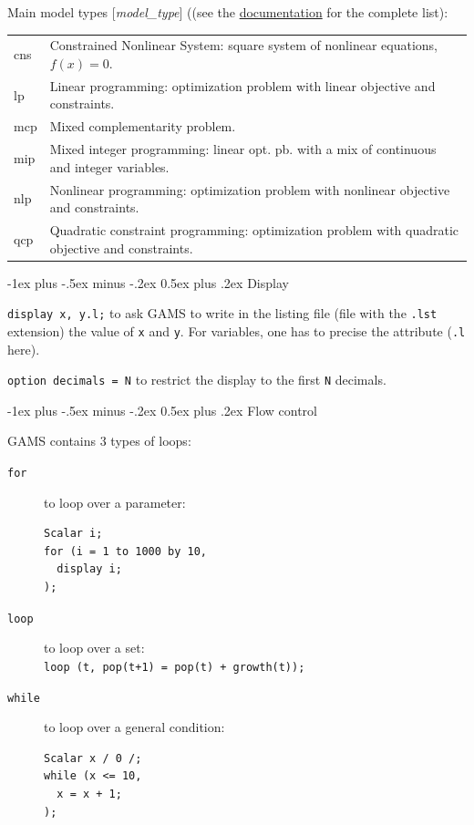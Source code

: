 \documentclass[10pt,landscape,a4paper]{article}
\makeatletter
\renewcommand{\section}{\@startsection{section}{1}{0mm}%
                                {-1ex plus -.5ex minus -.2ex}%
                                {0.5ex plus .2ex}%
                                {\color{blue}\normalfont\large\bfseries}}
\makeatother
\begin{document}
\begin{multicols}{2}
Main model types [\emph{model\_type}] ((see the
\href{https://www.gams.com/latest/docs/UG_ModelSolve.html#UG_ModelSolve_ModelClassificationOfModels}{documentation}
for the complete list):\\
\begin{tabularx}{\columnwidth}{@{}>{\ttfamily}lX@{}}
cns  & Constrained Nonlinear System: square system of nonlinear
equations, $f\left(x\right)=0$.\\
lp  & Linear programming: optimization problem with linear objective and constraints.\\
mcp  & Mixed complementarity problem.\\
mip & Mixed integer programming: linear opt. pb. with a mix of
continuous and integer variables.\\
nlp  & Nonlinear programming: optimization problem with nonlinear
objective and constraints.\\
qcp  & Quadratic constraint programming: optimization problem with
quadratic objective and constraints.
\end{tabularx}

\section{Display}

\verb!display x, y.l;! to ask GAMS to write in the listing file (file with the
\texttt{.lst} extension) the value of \verb!x!  and \verb!y!. For variables, one
has to precise the attribute (\verb!.l! here).

\verb!option decimals = N! to restrict the display to the first \verb!N!
decimals.

\section{Flow control}

GAMS contains 3 types of loops:
\begin{description}
\item[\texttt{for}] to loop over a parameter:\\
\begin{verbatim}
Scalar i;
for (i = 1 to 1000 by 10,
  display i;
);
\end{verbatim}
\item[\texttt{loop}] to loop over a set:\\
  \verb!loop (t, pop(t+1) = pop(t) + growth(t));!
\item[\texttt{while}] to loop over a general condition:\\
\begin{verbatim}
Scalar x / 0 /;
while (x <= 10,
  x = x + 1;
);
\end{verbatim}
\end{description}


\end{multicols}
\end{document}
